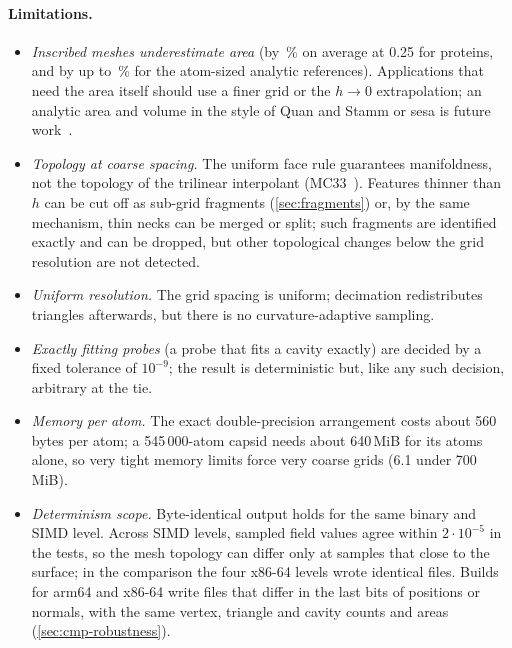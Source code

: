 \paragraph{Limitations.}
\begin{itemize}
  \item \emph{Inscribed meshes underestimate area} (by
    \,\% on average at 0.25\Ang{} for proteins, and by
    up to \,\% for the atom-sized analytic
    references). Applications that need the area itself
    should use a finer grid or the $h \to 0$ extrapolation; an analytic
    area and volume in the style of Quan and Stamm or sesa is future
    work~\cite{quan2016,wang2024sesa}.
  \item \emph{Topology at coarse spacing.} The uniform face rule guarantees
    manifoldness, not the topology of the trilinear interpolant
    (MC33~\cite{lewiner2003,custodio2013}). Features thinner than $h$ can
    be cut off as sub-grid fragments (\cref{sec:fragments}) or, by the
    same mechanism, thin necks can be merged or split; such fragments are
    identified exactly and can be dropped, but other topological changes
    below the grid resolution are not detected.
  \item \emph{Uniform resolution.} The grid spacing is uniform; decimation
    redistributes triangles afterwards, but there is no curvature-adaptive
    sampling.
  \item \emph{Exactly fitting probes} (a probe that fits a cavity exactly)
    are decided by a fixed tolerance of $10^{-9}$\Ang; the result is
    deterministic but, like any such decision, arbitrary at the tie.
  \item \emph{Memory per atom.} The exact double-precision arrangement
    costs about 560 bytes per atom; a 545\,000-atom capsid needs about
    640\,MiB for its atoms alone, so very tight memory limits force very
    coarse grids (6.1\Ang{} under 700\,MiB).
  \item \emph{Determinism scope.} Byte-identical output holds for the same
    binary and SIMD level. Across SIMD levels, sampled field values agree
    within $2\cdot10^{-5}$\Ang{} in the tests, so the mesh topology can
    differ only at samples that close to the surface; in the comparison the
    four x86-64 levels wrote identical files. Builds for arm64 and x86-64
    write files that differ in the last bits of positions or normals, with
    the same vertex, triangle and cavity counts and areas
    (\cref{sec:cmp-robustness}).
\end{itemize}

